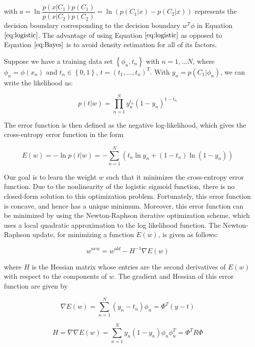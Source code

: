 \documentclass{SMBV12}
\begin{document}
with $a = \ln \dfrac{p(x|C_1)p(C_1)}{p(x|C_2)p(C_2)} = \ln(p(C_1|x) - p(C_2|x))$ represents the decision boundary corresponding to the decision boundary $w^T\phi$ in Equation $\ref{eq:logistic}$. The advantage of using Equation $\ref{eq:logistic}$ as opposed to Equation $\ref{eq:Bayes}$ is to avoid density estimation for all of its factors.

Suppose we have a training data set $\left\lbrace \phi_n, t_n \right\rbrace$ with $n = 1, ... N$, where $\phi_n = \phi(x_n)$ and $t_n \in \left\lbrace 0, 1 \right\rbrace$, $t = (t_1, ..., t_n)^T$. With $y_n = p(C_1|\phi_n)$, we can write the likelihood as:

\begin{equation}
p(t|w) = \prod\limits_{n = 1}^{N}y_n^{t_n} (1 - y_n)^{1 - t_n}
\end{equation}

The error function is then defined as the negative log-likelihood, which gives the cross-entropy error function in the form

\begin{equation}
E(w) = - \ln p(t|w) = - \sum\limits_{n = 1}^{N} \left( t_n \ln y_n + (1 - t_n) \ln(1 - y_n) \right)
\end{equation}

Our goal is to learn the weight $w$ such that it minimizes the cross-entropy error function. Due to the nonlinearity of the logistic sigmoid function, there is no closed-form solution to this optimization problem. Fortunately, this error function is concave, and hence has a unique minimum. Moreover, this error function can be minimized by using the Newton-Raphson iterative optimization scheme, which uses a local quadratic approximation to the log likelihood function. The Newton-Raphson update, for minimizing a function $E(w)$, is given as follows:

\begin{equation}
w^{new} = w^{old} - H^{-1} \nabla E(w)
\end{equation}

where $H$ is the Hessian matrix whose entries are the second derivatives of $E(w)$ with respect to the components of $w$. The gradient and Hessian of this error function are given by

\begin{equation}
\nabla E(w) = \sum\limits_{n = 1}^{N}(y_n - t_n) \phi_n = \Phi^T(y - t)
\end{equation}

\begin{equation}
H = \nabla \nabla E(w) = \sum\limits_{n = 1}^{N} y_n(1 - y_n) \phi_n \phi_n^T = \Phi^T R \Phi
\end{equation}
\end{document}
